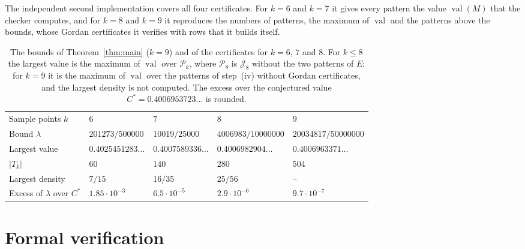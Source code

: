\documentclass[11pt]{amsart}
\theoremstyle{definition}
\theoremstyle{remark}
\numberwithin{equation}{section}
\newcommand{\cP}{\mathcal{P}}
\newcommand{\cJ}{\mathcal{J}}
\newcommand{\val}{\operatorname{val}}
\newcommand{\BOUNDF}{20034817/50000000}
\newcommand{\EXMAX}{0.4006963371\ldots}
\newcommand{\BOUNDEIGHTF}{4006983/10000000}
\newcommand{\EXMAXEIGHT}{0.4006982904\ldots}
\begin{document}
The independent second implementation covers all four certificates. For $k=6$ and $k=7$ it gives every pattern the value $\val(M)$ that the checker computes, and for $k=8$ and $k=9$ it reproduces the numbers of patterns, the maximum of $\val$ and the patterns above the bounds, whose Gordan certificates it verifies with rows that it builds itself.

\begin{table}[ht]
\centering
\caption{The bounds of Theorem~\ref{thm:main} ($k=9$) and of the certificates for $k=6$, $7$ and $8$. For $k\le8$ the largest value is the maximum of $\val$ over $\cP_k$, where $\cP_8$ is $\cJ_8$ without the two patterns of $E$; for $k=9$ it is the maximum of $\val$ over the patterns of step~(iv) without Gordan certificates, and the largest density is not computed. The excess over the conjectured value $C^*=0.4006953723\ldots$ is rounded.}\label{tab:cert}
\footnotesize
\setlength{\tabcolsep}{4pt}
\begin{tabular}{@{}>{\raggedright\arraybackslash}p{2.9cm}>{\raggedright\arraybackslash}p{2.75cm}>{\raggedright\arraybackslash}p{2.75cm}>{\raggedright\arraybackslash}p{2.75cm}>{\raggedright\arraybackslash}p{2.75cm}@{}}
\toprule
Sample points $k$ & $6$ & $7$ & $8$ & $9$\\
Bound $\lambda$ & $201273/500000$ & $10019/25000$ & $\BOUNDEIGHTF$ & $\BOUNDF$\\
Largest value & $0.4025451283\ldots$ & $0.4007589336\ldots$ & $\EXMAXEIGHT$ & $\EXMAX$\\
$|T_k|$ & $60$ & $140$ & $280$ & $504$\\
Largest density & $7/15$ & $16/35$ & $25/56$ & --\\
Excess of $\lambda$ over $C^*$ & $1.85\cdot10^{-3}$ & $6.5\cdot10^{-5}$ & $2.9\cdot10^{-6}$ & $9.7\cdot10^{-7}$\\
\bottomrule
\end{tabular}
\end{table}

\FloatBarrier
\section{Formal verification}\label{sec:lean}
\end{document}
